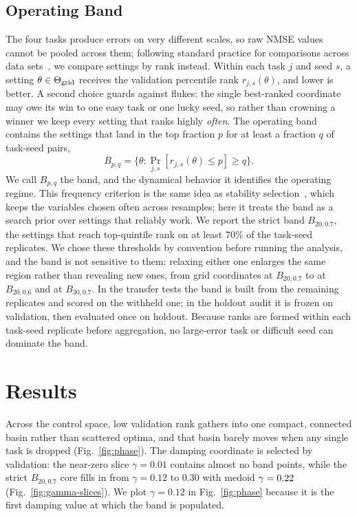 \documentclass[10pt,conference]{IEEEtran}
\begin{document}
\subsection{Operating Band}
The four tasks produce errors on very different scales, so raw NMSE values cannot be pooled across them; following standard practice for comparisons across data sets~\cite{demsar2006}, we compare settings by rank instead. Within each task $j$ and seed $s$, a setting $\theta\in\Theta_{\rm grid}$ receives the validation percentile rank $r_{j,s}(\theta)$, and lower is better. A second choice guards against flukes: the single best-ranked coordinate may owe its win to one easy task or one lucky seed, so rather than crowning a winner we keep every setting that ranks highly \emph{often}. The operating band contains the settings that land in the top fraction $p$ for at least a fraction $q$ of task-seed pairs,
\begin{equation}
B_{p,q}=\{\theta:\Pr_{j,s}[r_{j,s}(\theta)\le p]\ge q\}.
\end{equation}
We call $B_{p,q}$ the band, and the dynamical behavior it identifies the operating regime. This frequency criterion is the same idea as stability selection~\cite{meinshausen2010}, which keeps the variables chosen often across resamples; here it treats the band as a search prior over settings that reliably work. We report the strict band $B_{20,0.7}$, the settings that reach top-quintile rank on at least $70\%$ of the task-seed replicates. We chose these thresholds by convention before running the analysis, and the band is not sensitive to them: relaxing either one enlarges the same region rather than revealing new ones, from \PhaseBTwentyQSeventySize{} grid coordinates at $B_{20,0.7}$ to \PhaseBTwentyQSixtySize{} at $B_{20,0.6}$ and \PhaseBThirtyQSeventySize{} at $B_{30,0.7}$. In the transfer tests the band is built from the remaining replicates and scored on the withheld one; in the holdout audit it is frozen on validation, then evaluated once on holdout. Because ranks are formed within each task-seed replicate before aggregation, no large-error task or difficult seed can dominate the band.




\section{Results}
Across the control space, low validation rank gathers into one compact, connected basin rather than scattered optima, and that basin barely moves when any single task is dropped (Fig.~\ref{fig:phase}). The damping coordinate is selected by validation: the near-zero slice $\gamma=0.01$ contains almost no band points, while the strict $B_{20,0.7}$ core fills in from $\gamma=0.12$ to $0.30$ with medoid $\gamma=0.22$ (Fig.~\ref{fig:gamma-slices}). We plot $\gamma=0.12$ in Fig.~\ref{fig:phase} because it is the first damping value at which the band is populated.
\end{document}
